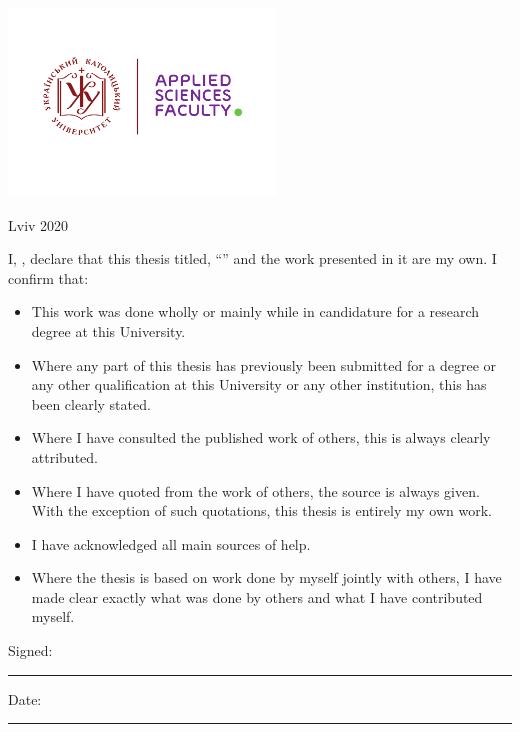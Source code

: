 \documentclass[
    11pt, 
    english, 
    singlespacing,
    headsepline,
    openany
]{MastersDoctoralThesis}
\begin{document}
\begin{titlepage}
\begin{center}
\vfill
\includegraphics[height=5cm]{UCU-Apps.png} %

\vfill
{\large Lviv 2020}\\[4cm] %
 
\vfill
\end{center}
\end{titlepage}


\begin{declaration}
\addchaptertocentry{\authorshipname} %
\noindent I, \authorname, declare that this thesis titled, \enquote{\ttitle} and the work presented in it are my own. I confirm that:

\begin{itemize} 
\item This work was done wholly or mainly while in candidature for a research degree at this University.
\item Where any part of this thesis has previously been submitted for a degree or any other qualification at this University or any other institution, this has been clearly stated.
\item Where I have consulted the published work of others, this is always clearly attributed.
\item Where I have quoted from the work of others, the source is always given. With the exception of such quotations, this thesis is entirely my own work.
\item I have acknowledged all main sources of help.
\item Where the thesis is based on work done by myself jointly with others, I have made clear exactly what was done by others and what I have contributed myself.\\
\end{itemize}
 
\noindent Signed:\\
\rule[0.5em]{25em}{0.5pt} %
 
\noindent Date:\\
\rule[0.5em]{25em}{0.5pt} %
\end{declaration}
\end{document}

